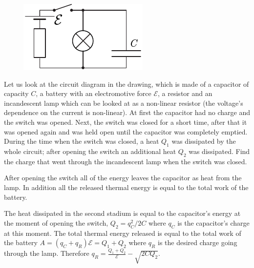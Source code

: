 \begin{figure}
\vspace{-10pt}
\begin{center}
\includegraphics[width=\linewidth]{2018-v3g-09-LC-Q}
\par\end{center} 
\end{figure}
Let us look at the circuit diagram in the drawing, which is made of a capacitor of capacity $C$, a battery with an electromotive force $\mathcal{E}$, a resistor and an incandescent lamp which can be looked at as a non-linear resistor (the voltage’s dependence on the current is non-linear). At first the capacitor had no charge and the switch was opened. Next, the switch was closed for a short time, after that it was opened again and was held open until the capacitor was completely emptied. During the time when the switch was closed, a heat $Q_1$ was dissipated by the whole circuit; after opening the switch an additional heat $Q_2$ was dissipated. Find the charge that went through the incandescent lamp when the switch was closed.

\hinteng
After opening the switch all of the energy leaves the capacitor as heat from the lamp. In addition all the released thermal energy is equal to the total work of the battery.

\solueng
The heat dissipated in the second stadium is equal to the capacitor’s energy at the moment of opening the switch, $Q_2=q_C^2/2C$ where $q_C$ is the capacitor’s charge at this moment. The total thermal energy released is equal to the total work of the battery $A=(q_C+q_R)\mathcal E=Q_1+Q_2$ where $q_R$ is the desired charge going through the lamp. Therefore $q_R=\frac{Q_1+Q_2}{\mathcal E}-\sqrt{2CQ_2}$.
\probend